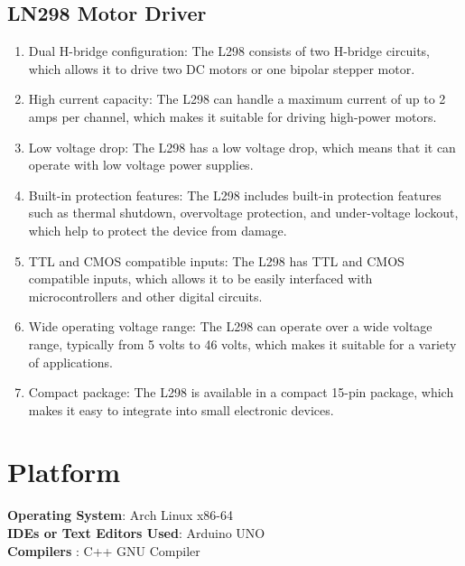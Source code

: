 \documentclass[11pt]{article}
\begin{document}
\subsection{LN298 Motor Driver}
\begin{enumerate}
	\item Dual H-bridge configuration: The L298 consists of two H-bridge circuits,
	      which allows it to drive two DC motors or one bipolar stepper motor.
	\item High current capacity: The L298 can handle a maximum current of up to 2
	      amps per channel, which makes it suitable for driving high-power motors.
	\item Low voltage drop: The L298 has a low voltage drop, which means that it
	      can operate with low voltage power supplies.
	\item Built-in protection features: The L298 includes built-in protection features
	      such as thermal shutdown, overvoltage protection, and under-voltage
	      lockout, which help to protect the device from damage.
	\item TTL and CMOS compatible inputs: The L298 has TTL and CMOS
	      compatible inputs, which allows it to be easily interfaced with
	      microcontrollers and other digital circuits.
	\item Wide operating voltage range: The L298 can operate over a wide voltage
	      range, typically from 5 volts to 46 volts, which makes it suitable for a
	      variety of applications.
	\item Compact package: The L298 is available in a compact 15-pin package,
	      which makes it easy to integrate into small electronic devices.
\end{enumerate}


\section{Platform}
\textbf{Operating System}: Arch Linux x86-64 \\
\textbf{IDEs or Text Editors Used}: Arduino UNO\\
\textbf{Compilers} : C++ GNU Compiler\\
\end{document}

